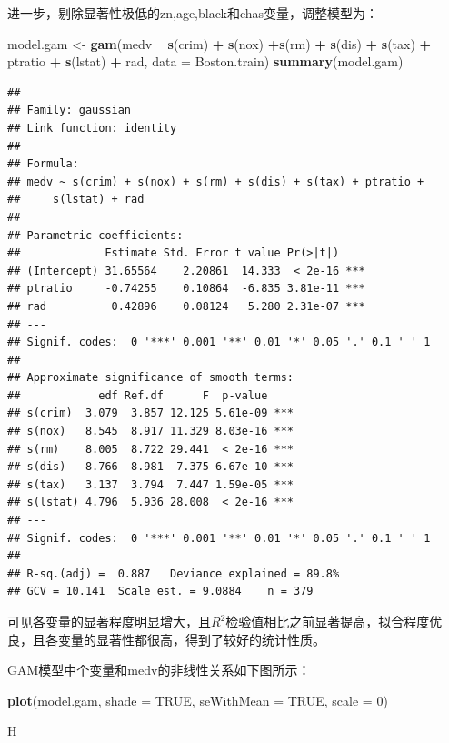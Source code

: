 \documentclass[UTF-8]{ctexart}
\newenvironment{Shaded}{\begin{snugshade}}{\end{snugshade}}
\newcommand{\DataTypeTok}[1]{\textcolor[rgb]{0.13,0.29,0.53}{#1}}
\newcommand{\DecValTok}[1]{\textcolor[rgb]{0.00,0.00,0.81}{#1}}
\newcommand{\KeywordTok}[1]{\textcolor[rgb]{0.13,0.29,0.53}{\textbf{#1}}}
\newcommand{\NormalTok}[1]{#1}
\newcommand{\OperatorTok}[1]{\textcolor[rgb]{0.81,0.36,0.00}{\textbf{#1}}}
\newcommand{\OtherTok}[1]{\textcolor[rgb]{0.56,0.35,0.01}{#1}}
\newcommand{\StringTok}[1]{\textcolor[rgb]{0.31,0.60,0.02}{#1}}
\begin{document}
进一步，剔除显著性极低的zn,age,black和chas变量，调整模型为：

\begin{Shaded}
	\begin{Highlighting}[]
\NormalTok{model.gam <-}\StringTok{ }\KeywordTok{gam}\NormalTok{(medv }\OperatorTok{~}\StringTok{ }\KeywordTok{s}\NormalTok{(crim)  }\OperatorTok{+}\StringTok{ }\KeywordTok{s}\NormalTok{(nox) }\OperatorTok{+}\KeywordTok{s}\NormalTok{(rm) }\OperatorTok{+}\StringTok{ }\KeywordTok{s}\NormalTok{(dis) }\OperatorTok{+}\StringTok{ }
\StringTok{            }\KeywordTok{s}\NormalTok{(tax) }\OperatorTok{+}\StringTok{ }\NormalTok{ptratio }\OperatorTok{+}\StringTok{ }\KeywordTok{s}\NormalTok{(lstat)  }\OperatorTok{+}\StringTok{ }\NormalTok{rad, }
\DataTypeTok{data =}\NormalTok{ Boston.train)}
\KeywordTok{summary}\NormalTok{(model.gam)}
	\end{Highlighting}
\end{Shaded}

\begin{verbatim}
## 
## Family: gaussian 
## Link function: identity 
## 
## Formula:
## medv ~ s(crim) + s(nox) + s(rm) + s(dis) + s(tax) + ptratio + 
##     s(lstat) + rad
## 
## Parametric coefficients:
##             Estimate Std. Error t value Pr(>|t|)    
## (Intercept) 31.65564    2.20861  14.333  < 2e-16 ***
## ptratio     -0.74255    0.10864  -6.835 3.81e-11 ***
## rad          0.42896    0.08124   5.280 2.31e-07 ***
## ---
## Signif. codes:  0 '***' 0.001 '**' 0.01 '*' 0.05 '.' 0.1 ' ' 1
## 
## Approximate significance of smooth terms:
##            edf Ref.df      F  p-value    
## s(crim)  3.079  3.857 12.125 5.61e-09 ***
## s(nox)   8.545  8.917 11.329 8.03e-16 ***
## s(rm)    8.005  8.722 29.441  < 2e-16 ***
## s(dis)   8.766  8.981  7.375 6.67e-10 ***
## s(tax)   3.137  3.794  7.447 1.59e-05 ***
## s(lstat) 4.796  5.936 28.008  < 2e-16 ***
## ---
## Signif. codes:  0 '***' 0.001 '**' 0.01 '*' 0.05 '.' 0.1 ' ' 1
## 
## R-sq.(adj) =  0.887   Deviance explained = 89.8%
## GCV = 10.141  Scale est. = 9.0884    n = 379
\end{verbatim}

可见各变量的显著程度明显增大，且\(R^{2}\)检验值相比之前显著提高，拟合程度优良，且各变量的显著性都很高，得到了较好的统计性质。

GAM模型中个变量和medv的非线性关系如下图所示：

\begin{Shaded}
	\begin{Highlighting}[]
\KeywordTok{plot}\NormalTok{(model.gam, }\DataTypeTok{shade =} \OtherTok{TRUE}\NormalTok{, }\DataTypeTok{seWithMean =} \OtherTok{TRUE}\NormalTok{, }\DataTypeTok{scale =} \DecValTok{0}\NormalTok{)}
	\end{Highlighting}
\end{Shaded}H
\end{document}
